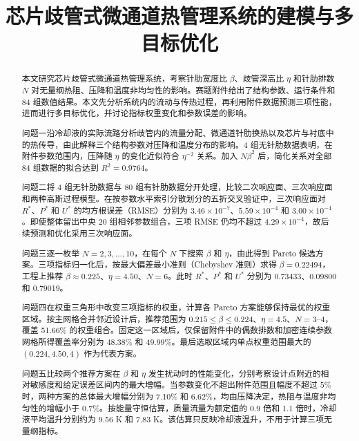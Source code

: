 \documentclass[withoutpreface,bwprint]{cumcmthesis}
\title{芯片歧管式微通道热管理系统的建模与多目标优化}
\newcommand{\Rstar}{R^{*}}
\newcommand{\Pstar}{P^{*}}
\newcommand{\Ustar}{U^{*}}
\begin{document}
\maketitle
\begin{abstract}
本文研究芯片歧管式微通道热管理系统，考察针肋宽度比 $\beta$、歧管深高比 $\eta$ 和针肋排数 $N$ 对无量纲热阻、压降和温度非均匀性的影响。赛题附件给出了结构参数、运行条件和 84 组数值结果。本文先分析系统内的流动与传热过程，再利用附件数据预测三项性能，进而进行多目标优化，并讨论指标权重变化和参数误差的影响。

问题一沿冷却液的实际流路分析歧管内的流量分配、微通道针肋换热以及芯片与衬底中的热传导，由此解释三个结构参数对压降和温度分布的影响。4 组无针肋数据表明，在附件参数范围内，压降随 $\eta$ 的变化近似符合 $\eta^{-2}$ 关系。加入 $N\beta^2$ 后，简化关系对全部 84 组数据的拟合达到 $R^2=0.9764$。

问题二将 4 组无针肋数据与 80 组有针肋数据分开处理，比较二次响应面、三次响应面和两种高斯过程模型。在按参数水平索引分散划分的五折交叉验证中，三次响应面对 $\Rstar$、$\Pstar$ 和 $\Ustar$ 的均方根误差（RMSE）分别为 $3.46\times10^{-7}$、$5.59\times10^{-4}$ 和 $3.00\times10^{-4}$。即使整体留出中央 20 组相邻参数组合，三项 RMSE 仍均不超过 $4.29\times10^{-4}$，故后续预测和优化采用三次响应面。

问题三逐一枚举 $N=2,3,\ldots,10$，在每个 $N$ 下搜索 $\beta$ 和 $\eta$，由此得到 Pareto 候选方案。三项指标归一化后，按最大偏差最小准则（Chebyshev 准则）求得 $\beta=0.22494$，工程上推荐 $\beta\approx0.225$、$\eta=4.50$、$N=6$。此时 $\Rstar$、$\Pstar$ 和 $\Ustar$ 分别为 0.73433、0.09800 和 0.79019。

问题四在权重三角形中改变三项指标的权重，计算各 Pareto 方案能够保持最优的权重区域。按主网格合并邻近设计后，推荐范围为 $0.215\leq\beta\leq0.224$、$\eta=4.5$、$N=3$--$4$，覆盖 51.66\% 的权重组合。固定这一区域后，仅保留附件中的偶数排数和加密连续参数网格所得覆盖率分别为 48.38\% 和 49.99\%。最后选取区域内单点权重范围最大的 $(0.224,4.50,4)$ 作为代表方案。

问题五比较两个推荐方案在 $\beta$ 和 $\eta$ 发生扰动时的性能变化，分别考察设计点附近的相对敏感度和给定误差区间内的最大增幅。当参数变化不超出附件范围且幅度不超过 $5\%$ 时，两种方案的总体最大增幅分别为 7.10\% 和 6.62\%，均由压降决定，热阻与温度非均匀性的增幅小于 0.7\%。按能量守恒估算，质量流量为额定值的 0.9 倍和 1.1 倍时，冷却液平均温升分别约为 9.56 K 和 7.83 K。该估算只反映冷却液温升，不用于计算三项无量纲指标。
\end{abstract}
\end{document}
